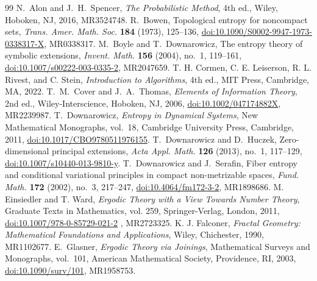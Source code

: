 \documentclass[10pt,a4paper]{amsart}
\numberwithin{equation}{section}
\begin{document}
\begin{thebibliography}{99}
 N.~Alon and J.~H.~Spencer, \emph{The Probabilistic Method}, 4th ed., Wiley, Hoboken, NJ, 2016, MR3524748.
 R.~Bowen, Topological entropy for noncompact sets, \emph{Trans. Amer. Math. Soc.} \textbf{184} (1973), 125--136, \href{https://doi.org/10.1090/S0002-9947-1973-0338317-X} {doi:10.1090/S0002-9947-1973-0338317-X}, MR0338317.
 M.~Boyle and T.~Downarowicz, The entropy theory of symbolic extensions, \emph{Invent. Math.} \textbf{156} (2004), no.~1, 119--161, \href{https://doi.org/10.1007/s00222-003-0335-2} {doi:10.1007/s00222-003-0335-2}, MR2047659.
 T. H. Cormen, C. E. Leiserson, R. L. Rivest, and C. Stein, \emph{Introduction to Algorithms}, 4th ed., MIT Press, Cambridge, MA, 2022.
 T.~M.~Cover and J.~A.~Thomas, \emph{Elements of Information Theory}, 2nd ed., Wiley-Interscience, Hoboken, NJ, 2006, \href{https://doi.org/10.1002/047174882X} {doi:10.1002/047174882X}, MR2239987.
 T.~Downarowicz, \emph{Entropy in Dynamical Systems}, New Mathematical Monographs, vol.~18, Cambridge University Press, Cambridge, 2011, \href{https://doi.org/10.1017/CBO9780511976155} {doi:10.1017/CBO9780511976155}.
 T.~Downarowicz and D.~Huczek, Zero-dimensional principal extensions, \emph{Acta Appl. Math.} \textbf{126} (2013), no.~1, 117--129, \href{https://doi.org/10.1007/s10440-013-9810-y} {doi:10.1007/s10440-013-9810-y}.
 T.~Downarowicz and J.~Serafin, Fiber entropy and conditional variational principles in compact non-metrizable spaces, \emph{Fund. Math.} \textbf{172} (2002), no.~3, 217--247, \href{https://doi.org/10.4064/fm172-3-2} {doi:10.4064/fm172-3-2}, MR1898686.
 M. Einsiedler and T. Ward, \emph{Ergodic Theory with a View Towards Number Theory}, Graduate Texts in Mathematics, vol. 259, Springer-Verlag, London, 2011, \href{http://doi:10.1007/978-0-85729-021-2}{doi:10.1007/978-0-85729-021-2} , MR2723325.
 K. J. Falconer, \emph{Fractal Geometry: Mathematical Foundations and Applications}, Wiley, Chichester, 1990, MR1102677.
 E.~Glasner, \emph{Ergodic Theory via Joinings}, Mathematical Surveys and Monographs, vol.~101, American Mathematical Society, Providence, RI, 2003, \href{https://doi.org/10.1090/surv/101} {doi:10.1090/surv/101}, MR1958753.

\end{thebibliography}
\end{document}
